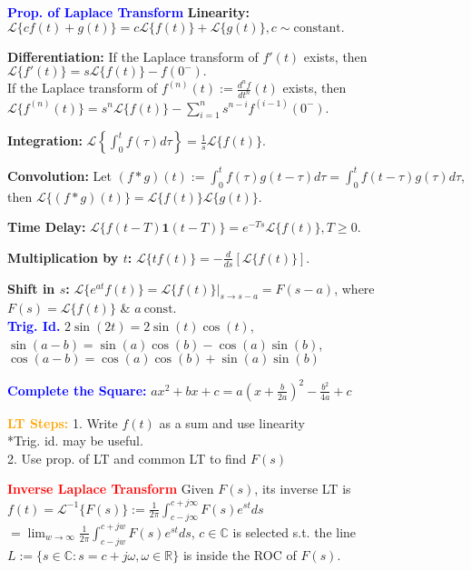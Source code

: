\documentclass[5pt]{extarticle} %
\begin{document}
\begin{paracol}{3}
{    \textcolor{blue}{\textbf{Prop. of Laplace Transform}} \textbf{Linearity:} \\ 
    $\mathcal{L} \{c f(t) + g(t)\} = c \mathcal{L} \{f(t)\} + \mathcal{L} \{g(t)\}, c \sim \text{constant}.$  
    
    \textbf{Differentiation:} If the Laplace transform of $f'(t)$ exists, then $\mathcal{L} \{f'(t)\} = s \mathcal{L} \{f(t)\} - f(0^-).$  \\
    If the Laplace transform of $f^{(n)}(t) := \frac{d^n f}{dt^n}(t)$ exists, then \\ 
    $\mathcal{L} \{f^{(n)}(t)\} = s^n \mathcal{L} \{f(t)\} - \sum_{i=1}^n s^{n-i} f^{(i-1)}(0^-).$  
    
    \textbf{Integration:}  
    $\mathcal{L} \left\{\int_0^t f(\tau) d\tau \right\} = \frac{1}{s} \mathcal{L} \{f(t)\}.$  
    
    \textbf{Convolution:} Let $(f * g)(t) := \int_0^t f(\tau) g(t-\tau) d\tau = \int_0^t f(t-\tau) g(\tau) d\tau$, then
    $\mathcal{L} \{(f * g)(t)\} = \mathcal{L} \{f(t)\} \mathcal{L} \{g(t)\}.$  
    
    \textbf{Time Delay:} $\mathcal{L} \{f(t-T) \mathbf{1}(t-T)\} = e^{-Ts} \mathcal{L} \{f(t)\}, T \geq 0.$  
    
    \textbf{Multiplication by $t$:} $\mathcal{L} \{t f(t)\} = -\frac{d}{ds} [\mathcal{L} \{f(t)\}].$  
    
    \textbf{Shift in $s$:} $\mathcal{L} \{e^{at} f(t)\} = \mathcal{L} \{f(t)\}\big|_{s \to s-a} = F(s-a)$, where $F(s) = \mathcal{L} \{f(t)\}$ \& $a ~ \text{const}$. \\   

    \textcolor{blue}{\textbf{Trig. Id.}} $2 \sin(2t) = 2 \sin(t) \cos(t)$, $\sin(a-b) = \sin(a) \cos(b) - \cos(a) \sin(b)$, $\cos(a-b) = \cos(a) \cos(b) + \sin(a) \sin(b)$

    \textcolor{blue}{\textbf{Complete the Square:}} $a x^2 + b x + c = a (x + \frac{b}{2a})^2 - \frac{b^2}{4a} + c$
    
    \textcolor{orange}{\textbf{LT Steps:}} 1. Write $f(t)$ as a sum and use linearity \\
    *Trig. id. may be useful. \\
    2. Use prop. of LT and common LT to find $F(s)$  

    \switchcolumn

    \textcolor{red}{\textbf{Inverse Laplace Transform}} Given $F(s)$, its inverse LT is  
    $f(t) = \mathcal{L}^{-1} \{ F(s) \} := \frac{1}{2\pi} \int_{c-j\infty}^{c+j\infty} F(s) e^{st} ds$ \\ 
    $= \lim_{w \to \infty} \frac{1}{2\pi} \int_{c-jw}^{c+jw} F(s) e^{st} ds$, $c \in \mathbb{C}$ is selected s.t. the line $L := \{s \in \mathbb{C} : s = c + j\omega, \omega \in \mathbb{R}\}$ is inside the ROC of $F(s)$.  
    
}
\end{paracol}
\end{document}
